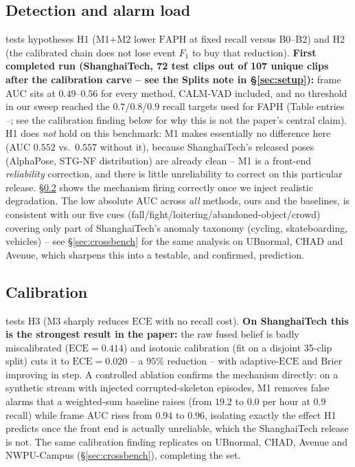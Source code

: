 \documentclass[conference]{IEEEtran}
\newcommand{\faph}{\mathrm{FAPH}}
\newcommand{\ece}{\mathrm{ECE}}
\begin{document}
\subsection{Detection and alarm load}

 tests hypotheses H1 (M1$+$M2 lower $\faph$ at fixed recall
versus B0--B2) and H2 (the calibrated chain does not lose event $F_1$ to buy
that reduction). \textbf{First completed run (ShanghaiTech, 72 test clips
out of 107 unique clips after the calibration carve -- see the Splits note in
\S\ref{sec:setup}):} frame AUC sits at $0.49$--$0.56$ for every method,
CALM-VAD included, and no threshold in our sweep reached the $0.7$/$0.8$/$0.9$
recall targets used for FAPH (Table entries \emph{--}; see the calibration
finding below for why this is not the paper's central claim). H1 does
\emph{not} hold on this benchmark: M1 makes essentially no difference here
(AUC $0.552$ vs.\ $0.557$ without it), because ShanghaiTech's released poses
(AlphaPose, STG-NF distribution) are already clean -- M1 is a front-end
\emph{reliability} correction, and there is little unreliability to correct
on this particular release. \S\ref{sec:m1ablation} shows the mechanism firing
correctly once we inject realistic degradation. The low absolute AUC across
\emph{all} methods, ours and the baselines, is consistent with our five
cues (fall/fight/loitering/abandoned-object/crowd) covering only part of
ShanghaiTech's anomaly taxonomy (cycling, skateboarding, vehicles) -- see
\S\ref{sec:crossbench} for the same analysis on UBnormal, CHAD and Avenue,
which sharpens this into a testable, and confirmed, prediction.

\subsection{Calibration}
\label{sec:m1ablation}

 tests H3 (M3 sharply reduces $\ece$ with no recall cost).
\textbf{On ShanghaiTech this is the strongest result in the paper:} the raw
fused belief is badly miscalibrated ($\ece=0.414$) and isotonic calibration
(fit on a disjoint 35-clip split) cuts it to $\ece=0.020$ -- a $95\%$
reduction -- with adaptive-$\ece$ and Brier improving in step. A controlled
ablation confirms the mechanism directly: on a synthetic stream with injected
corrupted-skeleton episodes, M1 removes false alarms that a weighted-sum
baseline raises (from $19.2$ to $0.0$ per hour at $0.9$ recall) while frame
AUC rises from $0.94$ to $0.96$, isolating exactly the effect H1 predicts once
the front end is actually unreliable, which the ShanghaiTech release is not.
The same calibration finding replicates on UBnormal, CHAD, Avenue and
NWPU-Campus (\S\ref{sec:crossbench}), completing the set.
\end{document}
